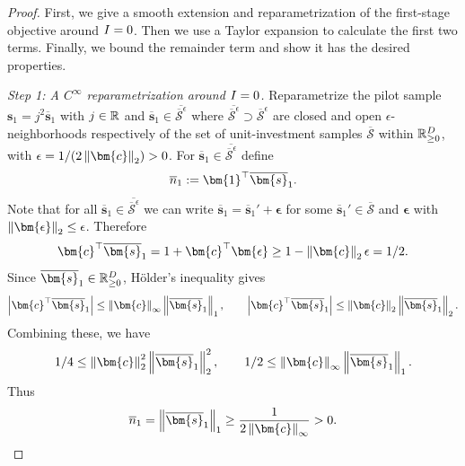 \begin{proof}
  First, we give a smooth extension and reparametrization of the first-stage objective around $I=0$.
  Then we use a Taylor expansion to calculate the first two terms.
  Finally, we bound the remainder term and show it has the desired properties.

  \emph{Step 1: A $C^{\infty}$ reparametrization around $I=0$.}
  Reparametrize the pilot sample $\bm{s}_1 = j^2 \overline{\bm{s}}_1$ with $j\in\mathbb{R}$ and $\overline{\bm{s}}_1\in \overline{\overline{\mathcal{S}}^{\epsilon}}$ where $\overline{\overline{\mathcal{S}}^{\epsilon}}\supset \overline{\mathcal{S}}^{\epsilon}$ are closed and open $\epsilon$-neighborhoods respectively of the set of unit-investment samples $\overline{\mathcal{S}}$ within $\mathbb{R}_{\ge 0}^D$, with $\epsilon = 1 / (2 \norm{\bm{c}}_2) > 0$.
  For $\overline{\bm{s}}_{1}\in\overline{\overline{\mathcal{S}}^{\epsilon}}$ define
  \[
    \overline{n}_{1} \defeq \bm{1}^{\top}\overline{\bm{s}}_{1}.
  \]
  Note that for all $\overline{\bm{s}}_{1}\in\overline{\overline{\mathcal{S}}^{\epsilon}}$ we can write $\overline{\bm{s}}_1 = \overline{\bm{s}}_1' + \bm{\epsilon}$ for some $\overline{\bm{s}}_1'\in\overline{\mathcal{S}}$ and $\bm{\epsilon}$ with $\norm{\bm{\epsilon}}_2 \le \epsilon$.
  Therefore
  \[
    \bm{c}^\top \overline{\bm{s}}_1 = 1 + \bm{c}^\top \bm{\epsilon}
    \ge 1 - \norm{\bm{c}}_2 \epsilon = 1/2.
  \]
  Since $\overline{\bm{s}}_1\in\R_{\ge 0}^D$, Hölder's inequality gives
  \[
    \left|\bm{c}^\top \overline{\bm{s}}_1\right| \le
    \norm{\bm{c}}_\infty
    \norm{\overline{\bm{s}}_1}_1,
    \qquad
    \left|\bm{c}^\top \overline{\bm{s}}_1\right| \le \norm{\bm{c}}_2
    \norm{\overline{\bm{s}}_1}_2.
  \]
  Combining these, we have
  \[
    1/4 \le \norm{\bm{c}}_2^2 \norm{\overline{\bm{s}}_1}_2^2,
    \qquad
    1/2 \le \norm{\bm{c}}_\infty \norm{\overline{\bm{s}}_1}_1.
  \]
  Thus
  \[
    \overline{n}_{1}
    =
    \norm{\overline{\bm{s}}_{1}}_1
    \ge
    \frac{1}{2 \norm{\bm{c}}_\infty}
    > 0.
  \]


\end{proof}
